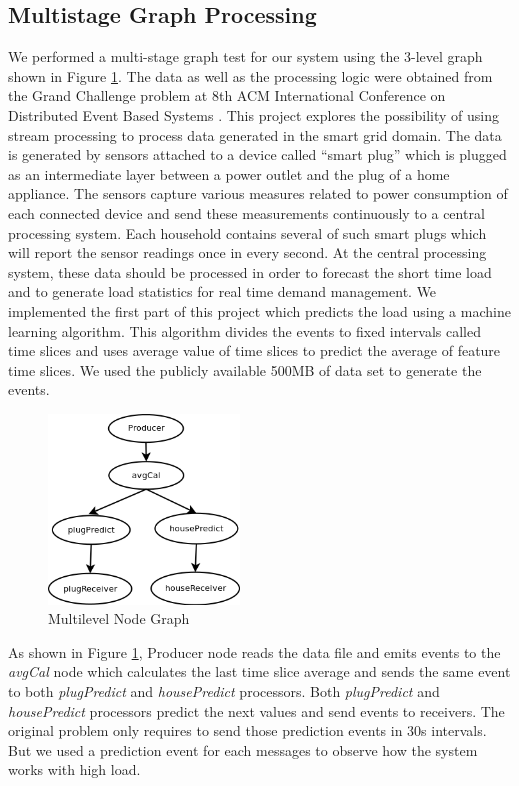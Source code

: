 \subsection{Multistage Graph Processing}
We performed a multi-stage graph test for our system using the 3-level graph shown in Figure \ref{multigraph}. The data as well as the processing logic were obtained from the Grand Challenge problem at 8th ACM International Conference on Distributed Event Based Systems \cite{acm}. This project explores the possibility of using stream processing to process data generated in the smart grid domain. The data is generated by sensors attached to a device called “smart plug” which is plugged as an intermediate layer between a power outlet and the plug of a home appliance. The sensors capture various measures related to power consumption of each connected device and send these measurements continuously to a central processing system. Each household contains several of such smart plugs which will report the sensor readings once in every second. At the central processing system, these data should be processed in order to forecast the short time load and to generate load statistics for real time demand management. We implemented the first part of this project which predicts the load using a machine learning algorithm. This algorithm divides the events to fixed intervals called  time slices and uses average value of time slices to predict the average of feature time slices. We used the publicly available 500MB of data set to generate the events.

\begin{figure}[!t]
        \centering
        \includegraphics[width=2.0in]{multigraph.png}
        \caption{Multilevel Node Graph}
        \label{multigraph}
\end{figure}

As shown in Figure \ref{multigraph}, Producer node reads the data file and emits events to the \textit{avgCal} node which calculates the last time slice average and sends the same event to both \textit{plugPredict} and \textit{housePredict} processors. Both \textit{plugPredict} and \textit{housePredict} processors predict the next values and send events to receivers. The original problem only requires to send those prediction events in 30s intervals. But we used a prediction event for each messages to observe how the system works with high load. 

